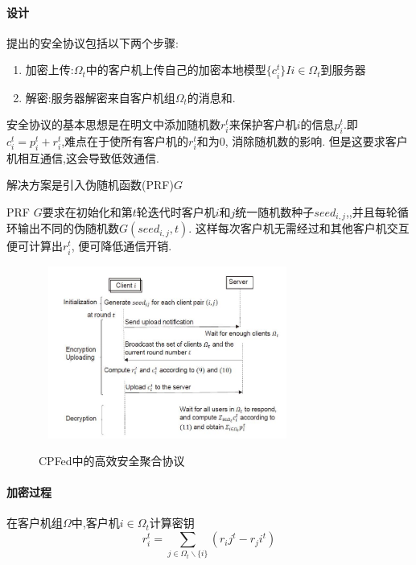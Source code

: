 \documentclass[a4paper]{article}
\theoremstyle{definition}
\numberwithin{equation}{section}
\begin{document}
\paragraph{设计}
提出的安全协议包括以下两个步骤:
\begin{enumerate}[label=(\arabic*)]  
    \item 加密上传:$\Omega_t$中的客户机上传自己的加密本地模型$\{ c_i^t\} I{i\in \Omega_t}$到服务器
\item 解密:服务器解密来自客户机组$\Omega_t$的消息和. 

\end{enumerate}

 
安全协议的基本思想是在明文中添加随机数$r_i^t$来保护客户机$i$的信息$p_i^t$.即$c^t_i = p^t_i +r^t_i$,难点在于使所有客户机的$r^t_i$和为0, 消除随机数的影响. 但是这要求客户机相互通信,这会导致低效通信.

解决方案是引入伪随机函数(PRF)$G$

PRF $G$要求在初始化和第$t$轮迭代时客户机$i$和$j$统一随机数种子$seed_{i,j}$,,并且每轮循环输出不同的伪随机数$G(seed_{i,j},t)$. 这样每次客户机无需经过和其他客户机交互便可计算出$r_i^t$, 便可降低通信开销.

\begin{figure}[ht]
    \
    \setlength{\abovecaptionskip}{0.1cm}
    \centering    
    \includegraphics[width=0.7\textwidth]{CPFed/secure-aggregation.jpg}
    \caption{CPFed中的高效安全聚合协议}
\end{figure}
 
\paragraph{加密过程}
在客户机组$\Omega$中,客户机$i \in \Omega_t$计算密钥
\begin{equation}
    r_i^t= \sum_{j \in \Omega_t \backslash \{i\}}(r_ij^t-r_ji^t)
\end{equation}
\end{document}
